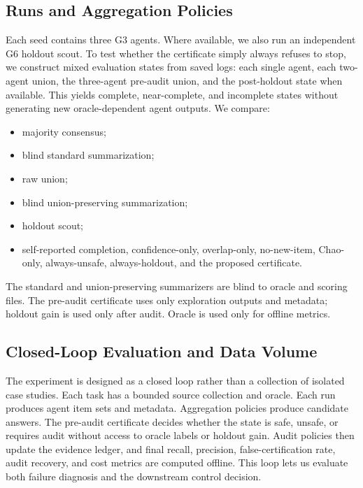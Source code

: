 \documentclass[letterpaper]{article}
\begin{document}
\subsection{Runs and Aggregation Policies}

Each seed contains three G3 agents. Where available, we also run an independent
G6 holdout scout. To test whether the certificate simply always refuses to stop,
we construct mixed evaluation states from saved logs: each single agent, each
two-agent union, the three-agent pre-audit union, and the post-holdout state
when available. This yields complete, near-complete, and incomplete states
without generating new oracle-dependent agent outputs. We compare:

\begin{itemize}
    \item majority consensus;
    \item blind standard summarization;
    \item raw union;
    \item blind union-preserving summarization;
    \item holdout scout;
    \item self-reported completion, confidence-only, overlap-only, no-new-item,
    Chao-only, always-unsafe, always-holdout, and the proposed certificate.
\end{itemize}

The standard and union-preserving summarizers are blind to oracle and scoring
files. The pre-audit certificate uses only exploration outputs and metadata;
holdout gain is used only after audit. Oracle is used only for offline metrics.

\subsection{Closed-Loop Evaluation and Data Volume}

The experiment is designed as a closed loop rather than a collection of isolated
case studies. Each task has a bounded source collection and oracle. Each run
produces agent item sets and metadata. Aggregation policies produce candidate
answers. The pre-audit certificate decides whether the state is safe, unsafe, or
requires audit without access to oracle labels or holdout gain. Audit policies
then update the evidence ledger, and final recall, precision,
false-certification rate, audit recovery, and cost metrics are computed offline.
This loop lets us evaluate both failure diagnosis and the downstream control
decision.
\end{document}
